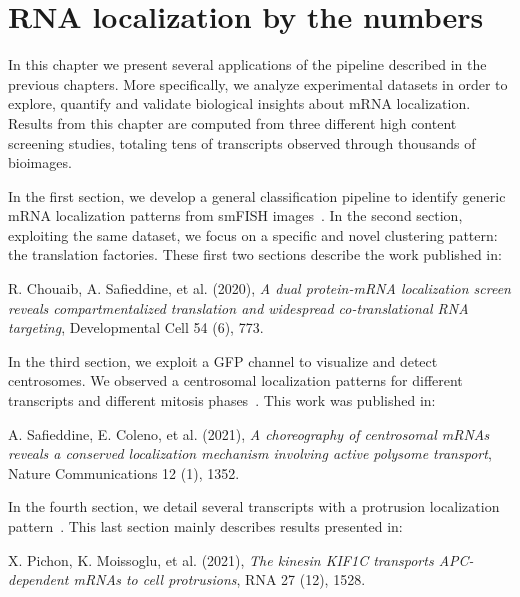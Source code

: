 
\graphicspath{{./figures/chapter5/}}

\chapter{RNA localization by the numbers}
\label{ch:chapter5}

\minitoc
\newpage

In this chapter we present several applications of the pipeline described in the previous chapters.
More specifically, we analyze experimental datasets in order to explore, quantify and validate biological insights about \ac{mRNA} localization.
Results from this chapter are computed from three different high content screening studies, totaling tens of transcripts observed through thousands of bioimages.

In the first section, we develop a general classification pipeline to identify generic \ac{mRNA} localization patterns from \ac{smFISH} images~\cite{CHOUAIB_2020}.
In the second section, exploiting the same dataset, we focus on a specific and novel clustering pattern: the translation factories.
These first two sections describe the work published in:

\begin{center}
	\color{green}
	R. Chouaib, A. Safieddine, et al. (2020), \textit{A dual protein-mRNA localization screen reveals compartmentalized translation and widespread co-translational RNA targeting}, Developmental Cell 54 (6), 773.
\end{center}

In the third section, we exploit a \ac{GFP} channel to visualize and detect centrosomes.
We observed a centrosomal localization patterns for different transcripts and different mitosis phases~\cite{safieddine_choreography_2021}.
This work was published in:

\begin{center}
	\color{green}
	A. Safieddine, E. Coleno, et al. (2021), \textit{A choreography of centrosomal mRNAs reveals a conserved localization mechanism involving active polysome transport}, Nature Communications 12 (1), 1352.
\end{center}

In the fourth section, we detail several transcripts with a protrusion localization pattern~\cite{pichon_kinesin_2021}.
This last section mainly describes results presented in:

\begin{center}
	\color{green}
	X. Pichon, K. Moissoglu, et al. (2021), \textit{The kinesin KIF1C transports APC-dependent mRNAs to cell protrusions}, RNA 27 (12), 1528.
\end{center}

